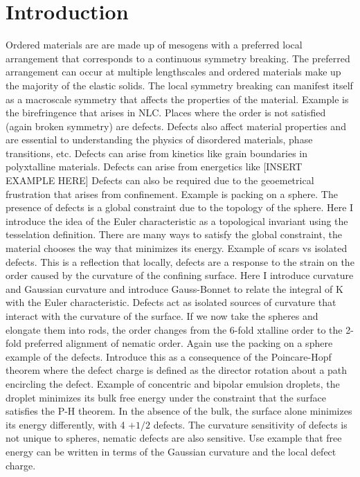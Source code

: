 \chapter{Introduction}
Ordered materials are are made up of mesogens with a preferred local arrangement that corresponds to a continuous symmetry breaking.
The preferred arrangement can occur at multiple lengthscales and ordered materials make up the majority of the elastic solids.
The local symmetry breaking can manifest itself as a macroscale symmetry that affects the properties of the material.
Example is the birefringence that arises in NLC.
Places where the order is not satisfied (again broken symmetry) are defects.
Defects also affect material properties and are essential to understanding the physics of disordered materials, phase transitions, etc.
Defects can arise from kinetics like grain boundaries in polyxtalline materials.
Defects can arise from energetics like [INSERT EXAMPLE HERE]
Defects can also be required due to the geoemetrical frustration that arises from confinement.
Example is packing on a sphere.
The presence of defects is a global constraint due to the topology of the sphere.
Here I introduce the idea of the Euler characteristic as a topological invariant using the tesselation definition.
There are many ways to satisfy the global constraint, the material chooses the way that minimizes its energy.
Example of scars vs isolated defects.
This is a reflection that locally, defects are a response to the strain on the order caused by the curvature of the confining surface.
Here I introduce curvature and Gaussian curvature and introduce Gauss-Bonnet to relate the integral of K with the Euler characteristic.
Defects act as isolated sources of curvature that interact with the curvature of the surface.
If we now take the spheres and elongate them into rods, the order changes from the 6-fold xtalline order to the 2-fold preferred alignment of nematic order.
Again use the packing on a sphere example of the defects.
Introduce this as a consequence of the Poincare-Hopf theorem where the defect charge is defined as the director rotation about a path encircling the defect.
Example of concentric and bipolar emulsion droplets, the droplet minimizes its bulk free energy under the constraint that the surface satisfies the P-H theorem.
In the absence of the bulk, the surface alone minimizes its energy differently, with 4 $+1/2$ defects.
The curvature sensitivity of defects is not unique to spheres, nematic defects are also sensitive.
Use example that free energy can be written in terms of the Gaussian curvature and the local defect charge.

